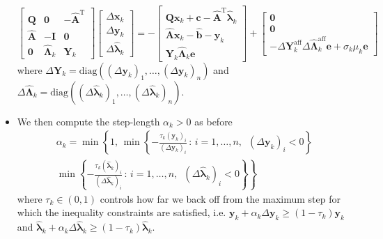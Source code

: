 \begin{itemize}
    \begin{equation} 
    \begin{bmatrix}
            \mathbf{Q} & \mathbf{0} & -\hat{\mathbf{A}}^\mathrm{T}\\
            \hat{\mathbf{A}} & -\mathbf{I} & \mathbf{0} \\
            \mathbf{0} & \hat{\mathbf{\Lambda}}_k &\mathbf{Y}_k
        \end{bmatrix} 
        \begin{bmatrix}
            \Delta\bm{x}_k \\ 
            \Delta\bm{y}_k \\
            \Delta\hat{\bm{\lambda}}_k
        \end{bmatrix} =
        -\begin{bmatrix}
            \mathbf{Q}\bm{x}_k + \bm{c} - \hat{\mathbf{A}}^\mathrm{T}\hat{\bm{\lambda}}_k\\
            \hat{\mathbf{A}}\bm{x}_k - \hat{\bm{b}} - \bm{y}_k\\
            \mathbf{Y}_k\hat{\mathbf{\Lambda}}_k\bm{e}
        \end{bmatrix}+ 
        \begin{bmatrix}
            \bm{0} \\
            \bm{0} \\
            -\Delta\mathbf{Y}_{k}^\mathrm{aff}\Delta\hat{\mathbf{\Lambda}}_{k}^\mathrm{aff}\bm{e} + \sigma_{k}\mu_{k}\bm{e}
        \end{bmatrix}
        \label{Sec_2_Eq_kekmanet}
    \end{equation}
    where $\Delta\mathbf{Y}_k = \mathrm{diag}\left( (\Delta\bm{y}_k)_1, \dots, (\Delta\bm{y}_k)_n\right)$ and $\Delta\hat{\mathbf{\Lambda}}_k = \mathrm{diag}( (\Delta\hat{\bm{\lambda}}_k)_1, \dots, (\Delta\hat{\bm{\lambda}}_k)_n)$.
    \item We then compute the step-length  $\alpha_{k}>0$ as before
    \begin{align}
        \alpha_{k} = \min\left\{ 1, \, \min\left\{ -\frac{\tau_k(\bm{y}_k)_i}{(\Delta\bm{y}_k)_i} \, : \, i =1, \dots, n,\,\,\, (\Delta\bm{y}_k)_i < 0\right\}\right.\nonumber\\
        \min\left.\left\{ -\frac{\tau_k(\hat{\bm{\lambda}}_k)_i}{(\Delta\hat{\bm{\lambda}}_k)_i} \, : \,  i =1, \dots, n,\,\,\, (\Delta\hat{\bm{\lambda}}_k)_i < 0\right\}    \right\}
        \label{Sec3_eq_tau}
    \end{align}
    where $\tau_k\in(0,1)$ controls how far we back off from the maximum step for which the inequality constraints are satisfied, i.e. $\bm{y}_k + \alpha_{k}\Delta\bm{y}_k\geq(1-\tau_k)\bm{y}_k$ and  $\hat{\bm{\lambda}}_k + \alpha_{k}\Delta\hat{\bm{\lambda}}_k\geq(1-\tau_k)\hat{\bm{\lambda}}_k$.

\end{itemize}

